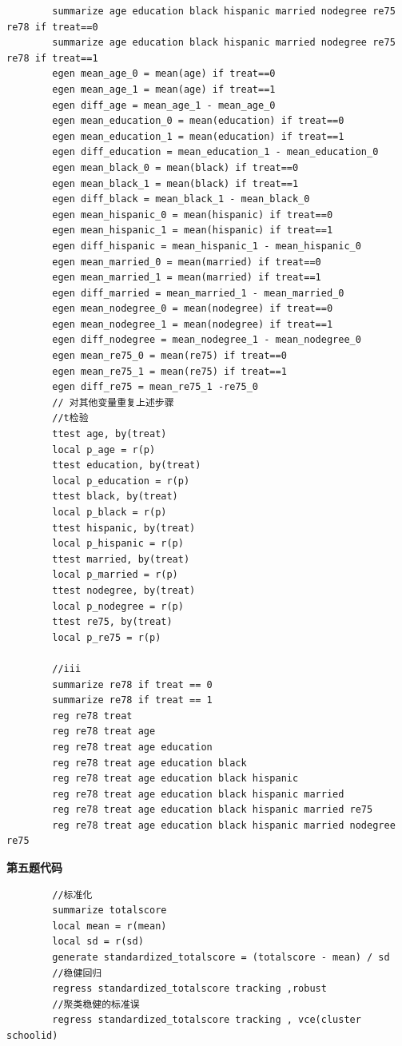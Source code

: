 \documentclass[a4paper]{ctexart}
\theoremstyle{remark}
\begin{document}
\begin{itemize}
\begin{lstlisting}
        summarize age education black hispanic married nodegree re75 re78 if treat==0
        summarize age education black hispanic married nodegree re75 re78 if treat==1
        egen mean_age_0 = mean(age) if treat==0
        egen mean_age_1 = mean(age) if treat==1
        egen diff_age = mean_age_1 - mean_age_0
        egen mean_education_0 = mean(education) if treat==0
        egen mean_education_1 = mean(education) if treat==1
        egen diff_education = mean_education_1 - mean_education_0
        egen mean_black_0 = mean(black) if treat==0
        egen mean_black_1 = mean(black) if treat==1
        egen diff_black = mean_black_1 - mean_black_0
        egen mean_hispanic_0 = mean(hispanic) if treat==0
        egen mean_hispanic_1 = mean(hispanic) if treat==1
        egen diff_hispanic = mean_hispanic_1 - mean_hispanic_0
        egen mean_married_0 = mean(married) if treat==0
        egen mean_married_1 = mean(married) if treat==1
        egen diff_married = mean_married_1 - mean_married_0
        egen mean_nodegree_0 = mean(nodegree) if treat==0
        egen mean_nodegree_1 = mean(nodegree) if treat==1
        egen diff_nodegree = mean_nodegree_1 - mean_nodegree_0
        egen mean_re75_0 = mean(re75) if treat==0
        egen mean_re75_1 = mean(re75) if treat==1
        egen diff_re75 = mean_re75_1 -re75_0
        // 对其他变量重复上述步骤
        //t检验
        ttest age, by(treat)
        local p_age = r(p)
        ttest education, by(treat)
        local p_education = r(p)
        ttest black, by(treat)
        local p_black = r(p)
        ttest hispanic, by(treat)
        local p_hispanic = r(p)
        ttest married, by(treat)
        local p_married = r(p)
        ttest nodegree, by(treat)
        local p_nodegree = r(p)
        ttest re75, by(treat)
        local p_re75 = r(p)

        //iii
        summarize re78 if treat == 0
        summarize re78 if treat == 1
        reg re78 treat
        reg re78 treat age
        reg re78 treat age education
        reg re78 treat age education black
        reg re78 treat age education black hispanic
        reg re78 treat age education black hispanic married
        reg re78 treat age education black hispanic married re75
        reg re78 treat age education black hispanic married nodegree re75
    \end{lstlisting}

{\fontsize{8pt}{12pt}\selectfont \textbf{第五题代码}}
    \begin{lstlisting}
        //标准化
        summarize totalscore
        local mean = r(mean)
        local sd = r(sd)
        generate standardized_totalscore = (totalscore - mean) / sd
        //稳健回归
        regress standardized_totalscore tracking ,robust
        //聚类稳健的标准误
        regress standardized_totalscore tracking , vce(cluster schoolid)
        

\end{lstlisting}
\end{itemize}
\end{document}
